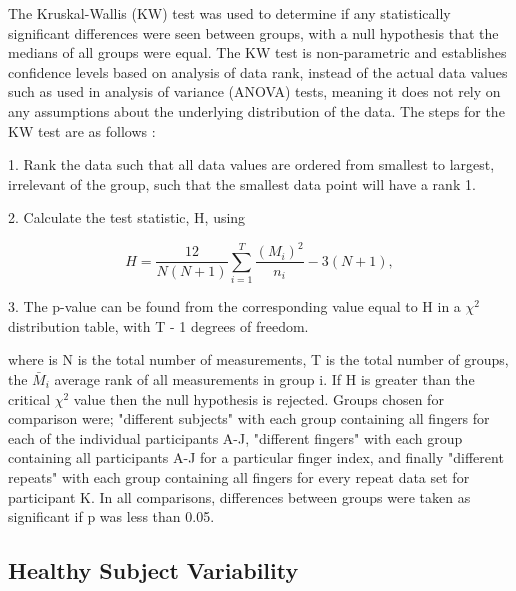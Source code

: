 \documentclass[twoside]{bhamthesis}
\theoremstyle{definition}
\begin{document}
The Kruskal-Wallis (KW) test was used to determine if any statistically significant differences were seen between groups, with a null hypothesis that the medians of all groups were equal. The KW test is non-parametric and establishes confidence levels based on analysis of data rank, instead of the actual data values such as used in analysis of variance (ANOVA) tests, meaning it does not rely on any assumptions about the underlying distribution of the data. The steps for the KW test are as follows \cite{altman1990practical}:

1. Rank the data such that all data values are ordered from smallest to largest, irrelevant of the group, such that the smallest data point will have a rank 1. 

2. Calculate the test statistic, H, using


\begin{equation}
 H =\frac{12}{N(N+1)} \sum_{i=1}^{T} \frac{(M_i)^2}{n_i} - 3(N+1),
  \label{eqn:dark_noise}
\end{equation}

3. The p-value can be found from the corresponding value equal to H in a $\chi^2$ distribution table, with T - 1 degrees of freedom.  



where is N is the total number of measurements, T is the total number of groups, the $\bar{M}_i$ average rank of all measurements in group i. If H is greater than the critical $\chi^2$ value then the null hypothesis is rejected. Groups chosen for comparison were; "different subjects" with each group containing all fingers for each of the individual participants A-J,  "different fingers" with each group containing all participants A-J for a particular finger index, and finally "different repeats" with each group containing all fingers for every repeat data set for participant K. In all comparisons, differences between groups were taken as significant if p was less than 0.05.

\subsection{Healthy Subject Variability}
\end{document}
